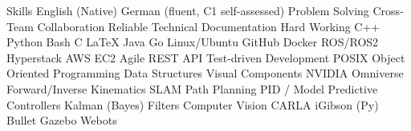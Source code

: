 
\begin{rubric}{Skills}
\entry*[Languages]
	\skilldotfirst English (Native) \skilldot German (fluent, C1 self-assessed)
\entry*[Strengths] 
	\skilldotfirst Problem Solving \skilldot Cross-Team Collaboration \skilldot Reliable \newline \skilldotfirst Technical Documentation \skilldot Hard Working %
\entry*[Coding]
	\skilldotfirst C++ \skilldot Python \skilldot Bash \skilldot C \skilldot LaTeX \skilldot Java \skilldot Go
\entry*[Software] 
	\skilldotfirst Linux/Ubuntu \skilldot GitHub \skilldot Docker \skilldot ROS/ROS2 \newline \skilldotfirst Hyperstack \skilldot AWS EC2
\entry*[Knowledge] 	
	\skilldotfirst Agile \skilldot REST API \skilldot Test-driven Development \skilldot POSIX  \newline \skilldotfirst Object Oriented Programming \skilldot Data Structures \skilldot Visual Components \skilldotfirst \skilldot NVIDIA Omniverse  
\entry*[Robotics]
	\skilldotfirst Forward/Inverse Kinematics \skilldot SLAM \skilldot Path Planning \newline \skilldotfirst PID / Model Predictive Controllers \skilldot Kalman (Bayes) Filters \skilldotfirst \skilldot Computer Vision
\entry*[Simulators] 
	\skilldotfirst CARLA \skilldot iGibson \skilldot (Py) Bullet \skilldot Gazebo \skilldot Webots

\end{rubric}
